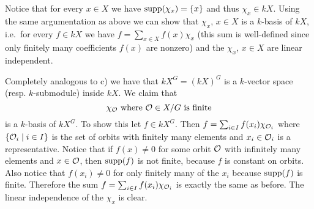Notice that for every $x \in X$ we have $\operatorname{supp}(\chi_x) = \{x\}$ and thus $\chi_x \in kX$. Using the same argumentation as above we can show that $\chi_x$, $x \in X$ is a $k$-basis of $kX$, i.e.\ for every $f \in kX$ we have $f = \sum_{x \in X} f(x) \chi_x$ (this sum is well-defined since only finitely many coefficients $f(x)$ are nonzero) and the $\chi_x$, $x \in X$ are linear independent.

Completely analogous to c) we have that $kX^G = (kX)^G$ is a $k$-vector space (resp. $k$-submodule) inside $kX$. We claim that
\[
  \chi_\mathcal{O} \text{ where } \mathcal{O} \in X/G \text{ is finite}
\]
is a $k$-basis of $kX^G$. To show this let $f \in kX^G$. Then $f = \sum_{i \in I} f(x_i) \chi_{\mathcal{O}_i}$ where $\{\mathcal{O}_i \mid i \in I\}$ is the set of orbits with finitely many elements and $x_i \in \mathcal{O}_i$ is a representative. Notice that if $f(x) \neq 0$ for some orbit $\mathcal{O}$ with infinitely many elements and $x \in \mathcal{O}$, then $\operatorname{supp}(f)$ is not finite, because $f$ is constant on orbits. Also notice that $f(x_i) \neq 0$ for only finitely many of the $x_i$ because $\operatorname{supp}(f)$ is finite. Therefore the sum $f = \sum_{i \in I} f(x_i) \chi_{\mathcal{O}_i}$ is exactly the same as before. The linear independence of the $\chi_x$ is clear.


